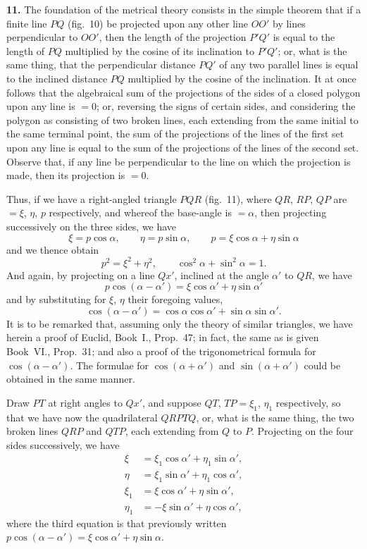 \documentclass[11pt,a4paper]{article}
\theoremstyle{definition}
\begin{document}
\textbf{11.} The foundation of the metrical theory consists in the simple theorem that if a finite line $PQ$ (fig.~10) be projected upon any other line $OO'$ by lines perpendicular to $OO'$, then the length of the projection $P'Q'$ is equal to the length of $PQ$ multiplied by the cosine of its inclination to $P'Q'$; or, what is the same thing, that the perpendicular distance $PQ'$ of any two parallel lines is equal to the inclined distance $PQ$ multiplied by the cosine of the inclination. It at once follows that the algebraical sum of the projections of the sides of a closed polygon upon any line is $=0$; or, reversing the signs of certain sides, and considering the polygon as consisting of two broken lines, each extending from the same initial to the same terminal point, the sum of the projections of the lines of the first set upon any line is equal to the sum of the projections of the lines of the second set. Observe that, if any line be perpendicular to the line on which the projection is made, then its projection is $=0$.

Thus, if we have a right-angled triangle $PQR$ (fig.~11), where $QR$, $RP$, $QP$ are $=\xi$, $\eta$, $p$ respectively, and whereof the base-angle is $=\alpha$, then projecting successively on the three sides, we have
\[
\xi = p\cos\alpha,\qquad \eta = p\sin\alpha,\qquad p = \xi\cos\alpha + \eta\sin\alpha
\]
and we thence obtain
\[
p^2 = \xi^2+\eta^2,\qquad \cos^2\alpha+\sin^2\alpha=1.
\]
And again, by projecting on a line $Qx'$, inclined at the angle $\alpha'$ to $QR$, we have
\[
p\cos(\alpha-\alpha') = \xi\cos\alpha' + \eta\sin\alpha'
\]
and by substituting for $\xi$, $\eta$ their foregoing values,
\[
\cos(\alpha-\alpha') = \cos\alpha\cos\alpha' + \sin\alpha\sin\alpha'.
\]
It is to be remarked that, assuming only the theory of similar triangles, we have herein a proof of Euclid, Book~I., Prop.~47; in fact, the same as is given Book~VI., Prop.~31; and also a proof of the trigonometrical formula for $\cos(\alpha-\alpha')$. The formulae for $\cos(\alpha+\alpha')$ and $\sin(\alpha+\alpha')$ could be obtained in the same manner.

Draw $PT$ at right angles to $Qx'$, and suppose $QT$, $TP=\xi_1$, $\eta_1$ respectively, so that we have now the quadrilateral $QRPTQ$, or, what is the same thing, the two broken lines $QRP$ and $QTP$, each extending from $Q$ to $P$. Projecting on the four sides successively, we have
\begin{align*}
\xi &= \xi_1\cos\alpha' + \eta_1\sin\alpha',\\
\eta &= \xi_1\sin\alpha' + \eta_1\cos\alpha',\\
\xi_1 &= \xi\cos\alpha' + \eta\sin\alpha',\\
\eta_1 &= -\xi\sin\alpha' + \eta\cos\alpha',
\end{align*}
where the third equation is that previously written $p\cos(\alpha-\alpha') = \xi\cos\alpha' + \eta\sin\alpha$.
\end{document}
